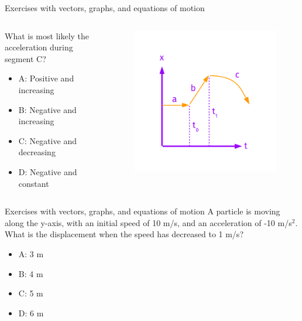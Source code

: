 \documentclass{beamer}
\begin{document}
\begin{frame}{Exercises with vectors, graphs, and equations of motion}
\begin{columns}[T]
\begin{column}{0.4\textwidth}
\small
What is most likely the acceleration during segment C?
\begin{itemize}
\item A: Positive and increasing
\item B: Negative and increasing
\item C: Negative and decreasing
\item D: Negative and constant
\end{itemize}
\end{column}
\begin{column}{0.6\textwidth}
\begin{figure}
\centering
\includegraphics[width=\textwidth,trim=0cm 0cm 0cm 1.5cm,clip=true]{figures/FurtherExercises.pdf}
\end{figure}
\end{column}
\end{columns}
\end{frame}

\begin{frame}{Exercises with vectors, graphs, and equations of motion}
A particle is moving along the y-axis, with an initial speed of 10 m/s, and an acceleration of -10 m/s$^2$.  What is the displacement when the speed has decreased to 1 m/s?\\
\begin{itemize}
\item A: 3 m
\item B: 4 m
\item C: 5 m
\item D: 6 m
\end{itemize}
\end{frame}
\end{document}
